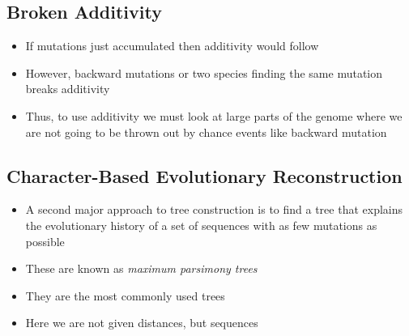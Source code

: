 \begin{slide}
\section{Broken Additivity}

\begin{PauseHighLight}
  \begin{itemize}
  \item If mutations just accumulated then additivity would follow\pause 
  \item However, backward mutations or two species finding the same
    mutation breaks additivity\pause
  \item Thus, to use additivity we must look at large parts of the genome
    where we are not going to be thrown out by chance events like
    backward mutation\pause
  \end{itemize}
\end{PauseHighLight}

\end{slide}

\Outline %

\begin{slide}
\section{Character-Based Evolutionary Reconstruction}

\begin{PauseHighLight}
  \begin{itemize}
  \item A second major approach to tree construction is to find a tree
    that explains the evolutionary history of a set of sequences with as
    few mutations as possible\pause
  \item These are known as \emph{maximum parsimony trees}\pause
  \item They are the most commonly used trees\pause
  \item Here we are not given distances, but sequences\pause
  \end{itemize}
\end{PauseHighLight}

\end{slide}


